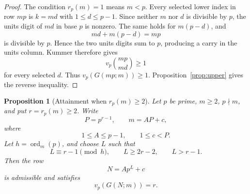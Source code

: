 \documentclass[11pt]{article}
\newtheorem{proposition}[theorem]{Proposition}
\theoremstyle{definition}
\theoremstyle{remark}
\begin{document}
\begin{proof}
The condition $r_p(m)=1$ means $m<p$. Every selected lower index in row $mp$ is $k=md$ with $1\le d\le p-1$. Since neither $m$ nor $d$ is divisible by $p$, the units digit of $md$ in base $p$ is nonzero. The same holds for $m(p-d)$, and
\[
  md+m(p-d)=mp
\]
is divisible by $p$. Hence the two units digits sum to $p$, producing a carry in the units column. Kummer therefore gives
\[
  v_p\binom{mp}{md}\ge1
\]
for every selected $d$. Thus $v_p(G(mp;m))\ge1$. Proposition~\ref{prop:upper} gives the reverse inequality.
\end{proof}

\begin{proposition}[Attainment when $r_p(m)\ge2$]\label{prop:rge2}
Let $p$ be prime, $m\ge2$, $p\nmid m$, and put $r=r_p(m)\ge2$. Write
\[
  P=p^{r-1},\qquad m=A P+c,
\]
where
\[
  1\le A\le p-1,\qquad 1\le c<P.
\]
Let $h=\operatorname{ord}_m(p)$, and choose $L$ such that
\[
  L\equiv r-1\pmod h,
  \qquad L\ge2r-2,
  \qquad L>r-1.
\]
Then the row
\[
  N=A p^L+c
\]
is admissible and satisfies
\[
  v_p(G(N;m))=r.
\]
\end{proposition}
\end{document}
